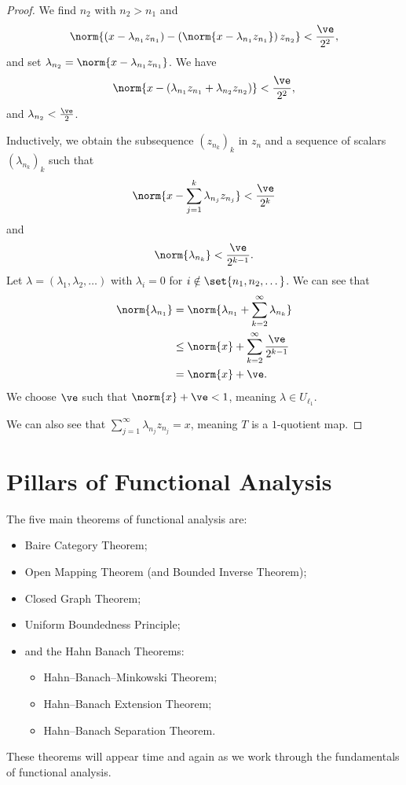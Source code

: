 \documentclass[10pt]{mypackage}
\begin{document}
\begin{proof}
  We find $n_{2}$ with $n_2 > n_1$ and
  \begin{align*}
    \norm{\left(x - \lambda_{n_1}z_{n_1}\right) - \left(\norm{x-\lambda_{n_1}z_{n_1}}\right)z_{n_2}} < \frac{\ve}{2^2},
  \end{align*}
  and set $\lambda_{n_2} = \norm{x - \lambda_{n_1}z_{n_1}}$. We have
  \begin{align*}
    \norm{x - \left(\lambda_{n_1}z_{n_1} + \lambda_{n_2}z_{n_2}\right)} < \frac{\ve}{2^2},
  \end{align*}
  and $\lambda_{n_2} < \frac{\ve}{2}$.\newline

  Inductively, we obtain the subsequence $\left(z_{n_k}\right)_k$ in $z_n$ and a sequence of scalars $\left(\lambda_{n_k}\right)_{k}$ such that
  \begin{align*}
    \norm{x - \sum_{j=1}^{k}\lambda_{n_j}z_{n_j}} < \frac{\ve}{2^k}
  \end{align*}
  and
  \begin{align*}
    \norm{\lambda_{n_k}} < \frac{\ve}{2^{k-1}}.
  \end{align*}
  Let $\lambda = \left(\lambda_{1},\lambda_2,\dots\right)$ with $\lambda_{i} = 0$ for $i\notin \set{n_1,n_2,\dots}$. We can see that
  \begin{align*}
    \norm{\lambda_{n_1}} &= \norm{\lambda_{n_1} + \sum_{k=2}^{\infty}\lambda_{n_k}}\\
                         &\leq \norm{x} + \sum_{k=2}^{\infty}\frac{\ve}{2^{k-1}}\\
                         &= \norm{x} + \ve.
  \end{align*}
  We choose $\ve$ such that $\norm{x} + \ve < 1$, meaning $\lambda \in U_{\ell_1}$.\newline

  We can also see that $\sum_{j=1}^{\infty}\lambda_{n_j}z_{n_j} = x$, meaning $T$ is a $1$-quotient map.
\end{proof}
\section{Pillars of Functional Analysis}%
The five main theorems of functional analysis are:
\begin{itemize}
  \item Baire Category Theorem;
  \item Open Mapping Theorem (and Bounded Inverse Theorem);
  \item Closed Graph Theorem;
  \item Uniform Boundedness Principle;
  \item and the Hahn Banach Theorems:
    \begin{itemize}
      \item Hahn--Banach--Minkowski Theorem;
      \item Hahn--Banach Extension Theorem;
      \item Hahn--Banach Separation Theorem.
    \end{itemize}
\end{itemize}
These theorems will appear time and again as we work through the fundamentals of functional analysis.
\end{document}
